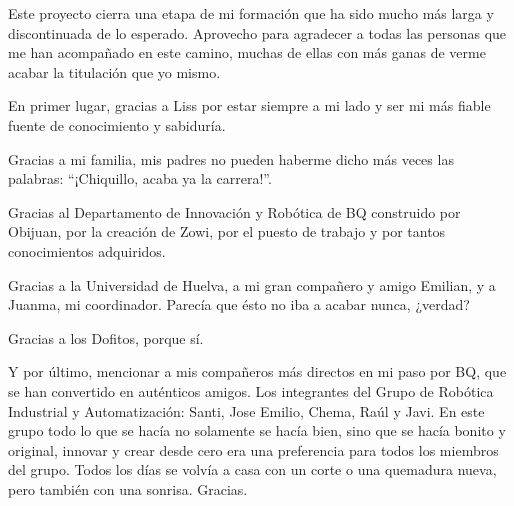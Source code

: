 \documentclass[
11pt, %
{english, spanish}, %
singlespacing, %
headsepline, %
]{MastersDoctoralThesis} %
\begin{document}
 \begin{acknowledgements}
 \addchaptertocentry{\acknowledgementname} %

Este proyecto cierra una etapa de mi formación que ha sido mucho más larga y discontinuada de lo esperado. Aprovecho para agradecer a todas las personas que me han acompañado en este camino, muchas de ellas con más ganas de verme acabar la titulación que yo mismo.

En primer lugar, gracias a Liss por estar siempre a mi lado y ser mi más fiable fuente de conocimiento y sabiduría.

Gracias a mi familia, mis padres no pueden haberme dicho más veces las palabras: ``¡Chiquillo, acaba ya la carrera!''.

Gracias al Departamento de Innovación y Robótica de BQ construido por Obijuan, por la creación de Zowi, por el puesto de trabajo y por tantos conocimientos adquiridos.

Gracias a la Universidad de Huelva, a mi gran compañero y amigo Emilian, y a Juanma, mi coordinador. Parecía que ésto no iba a acabar nunca, ¿verdad?

Gracias a los Dofitos, porque sí. %

Y por último, mencionar a mis compañeros más directos en mi paso por BQ, que se han convertido en auténticos amigos. Los integrantes del Grupo de Robótica Industrial y Automatización: Santi, Jose Emilio, Chema, Raúl y Javi. En este grupo todo lo que se hacía no solamente se hacía bien, sino que se hacía bonito y original, innovar y crear desde cero era una preferencia para todos los miembros del grupo. Todos los días se volvía a casa con un corte o una quemadura nueva, pero también con una sonrisa. Gracias.


 \end{acknowledgements}


\tableofcontents %

\listoffigures %

\listoftables %

%
%
%
\end{document}
